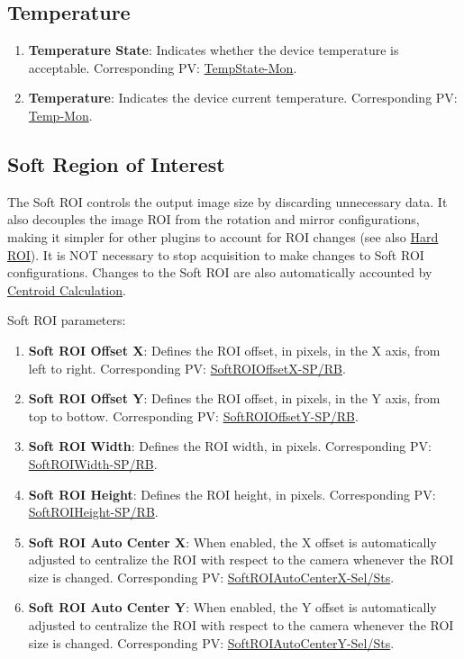 \documentclass[openany]{article}
\begin{document}
    \subsection{Temperature}\label{sec:temp}

        \begin{enumerate}
            \item \textbf{Temperature State}: Indicates whether the device temperature is acceptable. Corresponding PV: \hyperlink{pv:temp-state}{TempState-Mon}.
            \item \textbf{Temperature}: Indicates the device current temperature. Corresponding PV: \hyperlink{pv:temp}{Temp-Mon}.
        \end{enumerate}

    \subsection{Soft Region of Interest}\label{sec:soft-roi}

                The Soft ROI controls the output image size by discarding unnecessary data. It also decouples the image ROI from the rotation and mirror configurations, making it simpler for other plugins to account for ROI changes (see also \hyperref[sec:hard-roi]{Hard ROI}). It is NOT necessary to stop acquisition to make changes to Soft ROI configurations. Changes to the Soft ROI are also automatically accounted by \hyperref[sec:centroid-calc]{Centroid Calculation}.

        Soft ROI parameters:
        \begin{enumerate}
            \item \textbf{Soft ROI Offset X}: Defines the ROI offset, in pixels, in the X axis, from left to right. Corresponding PV: \hyperlink{pv:soft-roi-off-x}{SoftROIOffsetX-SP/RB}.
            \item \textbf{Soft ROI Offset Y}: Defines the ROI offset, in pixels, in the Y axis, from top to bottow. Corresponding PV: \hyperlink{pv:soft-roi-off-y}{SoftROIOffsetY-SP/RB}.
            \item \textbf{Soft ROI Width}: Defines the ROI width, in pixels. Corresponding PV: \hyperlink{pv:soft-roi-width}{SoftROIWidth-SP/RB}.
            \item \textbf{Soft ROI Height}: Defines the ROI height, in pixels. Corresponding PV: \hyperlink{pv:soft-roi-height}{SoftROIHeight-SP/RB}.
            \item \textbf{Soft ROI Auto Center X}: When enabled, the X offset is automatically adjusted to centralize the ROI with respect to the camera whenever the ROI size is changed. Corresponding PV: \hyperlink{pv:soft-roi-auto-center-x}{SoftROIAutoCenterX-Sel/Sts}.
            \item \textbf{Soft ROI Auto Center Y}: When enabled, the Y offset is automatically adjusted to centralize the ROI with respect to the camera whenever the ROI size is changed. Corresponding PV: \hyperlink{pv:soft-roi-auto-center-y}{SoftROIAutoCenterY-Sel/Sts}.
        \end{enumerate}
\end{document}
